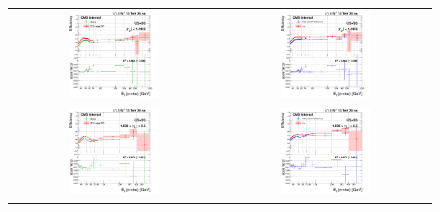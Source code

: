 \begin{figure}[htp]
  \begin{center}
    \begin{tabular}{cc}
      \includegraphics[width=0.45\textwidth]{figures/Zprime/2017/ScaleFactor/SameSign/nominal/g_compare_cut_Et_Barrel_ea_ta_inc_AS_nominal_PUW.png} &
      \includegraphics[width=0.45\textwidth]{figures/Zprime/2017/ScaleFactor/SameSign/nominal/g_compare_cut_Et_Barrel_ea_ta_exc_AS_nominal_PUW.png} \\
      \includegraphics[width=0.45\textwidth]{figures/Zprime/2017/ScaleFactor/SameSign/nominal/g_compare_cut_Et_Endcap_ea_ta_inc_AS_nominal_PUW.png} &
      \includegraphics[width=0.45\textwidth]{figures/Zprime/2017/ScaleFactor/SameSign/nominal/g_compare_cut_Et_Endcap_ea_ta_exc_AS_nominal_PUW.png}

\end{tabular}
\end{center}
\end{figure}
